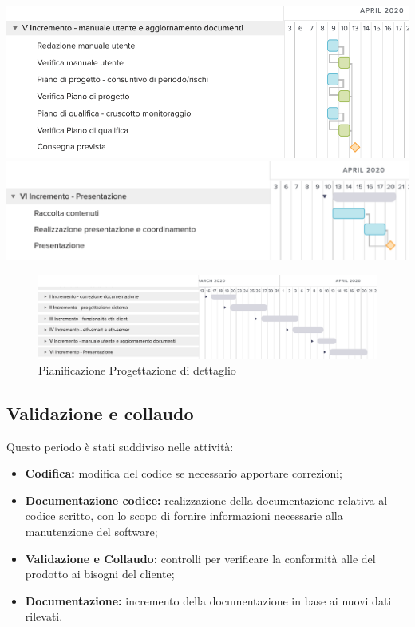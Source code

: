 	\includegraphics[width=\textwidth]{res/img/gantt/RQ/5}
	\includegraphics[width=\textwidth]{res/img/gantt/RQ/6}
\begin{figure}[h!]
	\includegraphics[width=\textwidth]{res/img/gantt/RQ/f}
	\caption{Pianificazione Progettazione di dettaglio}
\end{figure}
\subsection{Validazione e collaudo}
Questo periodo è stati suddiviso nelle attività:
\begin{itemize}
	\item \textbf{Codifica:} modifica del codice se necessario apportare correzioni;
	\item \textbf{Documentazione codice:} realizzazione della documentazione relativa al codice scritto, con lo scopo di fornire informazioni necessarie alla manutenzione del software;
	\item \textbf{Validazione e Collaudo:} controlli per verificare la conformità alle del prodotto ai bisogni del cliente;
	\item \textbf{Documentazione:} incremento della documentazione in base ai nuovi dati rilevati.
\end{itemize}
